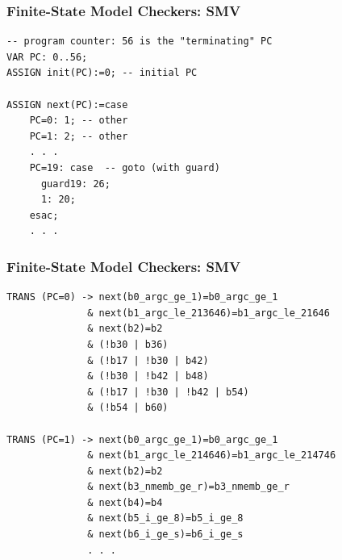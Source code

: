 
\begin{frame}[fragile]
\frametitle{Finite-State Model Checkers: SMV}


\begin{lstlisting}[basicstyle=\footnotesize,morekeywords={VAR,ASSIGN,case,esac,init}]
-- program counter: 56 is the "terminating" PC
VAR PC: 0..56;
ASSIGN init(PC):=0; -- initial PC

ASSIGN next(PC):=case
    PC=0: 1; -- other
    PC=1: 2; -- other
    . . .
    PC=19: case  -- goto (with guard)
      guard19: 26;
      1: 20;
    esac;
    . . .
\end{lstlisting}

\end{frame}


\begin{frame}[fragile]
\frametitle{Finite-State Model Checkers: SMV}


\begin{lstlisting}[basicstyle=\footnotesize,morekeywords={TRANS,next}]
TRANS (PC=0) -> next(b0_argc_ge_1)=b0_argc_ge_1
              & next(b1_argc_le_213646)=b1_argc_le_21646
              & next(b2)=b2
              & (!b30 | b36)
              & (!b17 | !b30 | b42)
              & (!b30 | !b42 | b48)
              & (!b17 | !b30 | !b42 | b54)
              & (!b54 | b60)

TRANS (PC=1) -> next(b0_argc_ge_1)=b0_argc_ge_1
              & next(b1_argc_le_214646)=b1_argc_le_214746
              & next(b2)=b2
              & next(b3_nmemb_ge_r)=b3_nmemb_ge_r
              & next(b4)=b4
              & next(b5_i_ge_8)=b5_i_ge_8
              & next(b6_i_ge_s)=b6_i_ge_s
              . . .
\end{lstlisting}

\end{frame}

